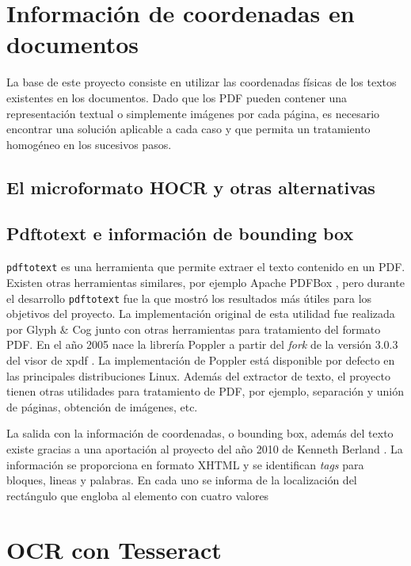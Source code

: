 \section{Información de coordenadas en documentos}

La base de este proyecto consiste en utilizar las coordenadas físicas de los textos existentes en los documentos. Dado que los PDF pueden contener una representación textual o simplemente imágenes por cada página, es necesario encontrar una solución aplicable a cada caso y que permita un tratamiento homogéneo en los sucesivos pasos.

\subsection{El microformato HOCR y otras alternativas}


\subsection{Pdftotext e información de bounding box}

\verb|pdftotext| es una herramienta que permite extraer el texto contenido en un PDF. Existen otras herramientas similares, por ejemplo Apache PDFBox \cite{the_apache_software_foundation_apache_nodate}, pero durante el desarrollo \verb|pdftotext| fue la que mostró los resultados más útiles para los objetivos del proyecto. La implementación original de esta utilidad fue realizada por Glyph \& Cog \cite{glyph__cog_llc_glyph_nodate-1} junto con otras herramientas para tratamiento del formato PDF. En el año 2005 nace la librería Poppler a partir del \emph{fork} de la versión 3.0.3 del visor de xpdf \cite{kristian_hogsberg_poppler_2012}. La implementación de Poppler está disponible por defecto en las principales distribuciones Linux. Además del extractor de texto, el proyecto tienen otras utilidades para tratamiento de PDF, por ejemplo, separación y unión de páginas, obtención de imágenes, etc.

La salida con la información de coordenadas, o bounding box, además del texto existe gracias a una aportación al proyecto del año 2010 de Kenneth Berland \cite{kenneth_berland_poppler_2010}. La información se proporciona en formato XHTML y se identifican \emph{tags} para bloques, lineas y palabras. En cada uno se informa de la localización del rectángulo que engloba al elemento con cuatro valores



\section{OCR con Tesseract}

